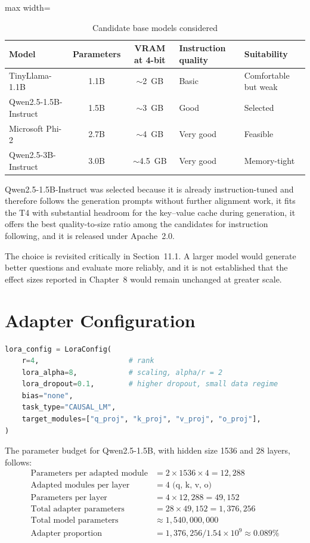\documentclass[12pt,a4paper]{report}
\begin{document}
\begin{table}[htbp]
\centering
\caption{Candidate base models considered}
\begin{adjustbox}{max width=\textwidth}
\begin{tabular}{>{\raggedright\arraybackslash}p{3.6cm} c c p{2.4cm} p{2.4cm}}
\toprule
\textbf{Model} & \textbf{Parameters} & \textbf{VRAM at 4-bit} & \textbf{Instruction quality} & \textbf{Suitability} \\
\midrule
TinyLlama-1.1B & 1.1B & $\sim$2~GB & Basic & Comfortable but weak \\
Qwen2.5-1.5B-Instruct & 1.5B & $\sim$3~GB & Good & Selected \\
Microsoft Phi-2 & 2.7B & $\sim$4~GB & Very good & Feasible \\
Qwen2.5-3B-Instruct & 3.0B & $\sim$4.5~GB & Very good & Memory-tight \\
\bottomrule
\end{tabular}
\end{adjustbox}
\end{table}

Qwen2.5-1.5B-Instruct was selected because it is already instruction-tuned and therefore follows the generation prompts without further alignment work, it fits the T4 with substantial headroom for the key--value cache during generation, it offers the best quality-to-size ratio among the candidates for instruction following, and it is released under Apache~2.0.

The choice is revisited critically in Section~11.1. A larger model would generate better questions and evaluate more reliably, and it is not established that the effect sizes reported in Chapter~8 would remain unchanged at greater scale.

\section{Adapter Configuration}

\begin{lstlisting}[language=Python]
lora_config = LoraConfig(
    r=4,                     # rank
    lora_alpha=8,            # scaling, alpha/r = 2
    lora_dropout=0.1,        # higher dropout, small data regime
    bias="none",
    task_type="CAUSAL_LM",
    target_modules=["q_proj", "k_proj", "v_proj", "o_proj"],
)
\end{lstlisting}

The parameter budget for Qwen2.5-1.5B, with hidden size 1536 and 28 layers, follows:
\begin{align*}
\text{Parameters per adapted module} &= 2 \times 1536 \times 4 = 12{,}288 \\
\text{Adapted modules per layer} &= 4 \text{ (q, k, v, o)} \\
\text{Parameters per layer} &= 4 \times 12{,}288 = 49{,}152 \\
\text{Total adapter parameters} &= 28 \times 49{,}152 = 1{,}376{,}256 \\
\text{Total model parameters} &\approx 1{,}540{,}000{,}000 \\
\text{Adapter proportion} &= 1{,}376{,}256 / 1.54\times10^9 \approx 0.089\%
\end{align*}
\end{document}

